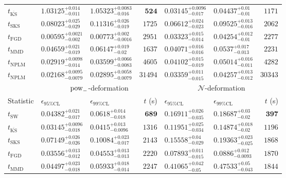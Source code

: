 \begin{tabular}{l|llr|llr}
	$t_{\overline{\mathrm{KS}}}$ & $1.03125_{-0.011}^{+0.014}$ & $1.05323_{-0.016}^{+0.0083}$ & ${\mathbf{524}}$ & ${\mathbf{0.03145_{-0.017}^{+0.0096}}}$ & $0.04437_{-0.01}^{+0.01}$ & $1171$ \\
	$t_{\mathrm{SKS}}$ & $0.08023_{-0.029}^{+0.025}$ & $0.11316_{-0.019}^{+0.026}$ & $1725$ & $0.06612_{-0.023}^{+0.024}$ & $0.09525_{-0.016}^{+0.013}$ & $2062$ \\
	$t_{\mathrm{FGD}}$ & ${\mathbf{0.00595_{-0.002}^{+0.0021}}}$ & ${\mathbf{0.00773_{-0.0016}^{+0.002}}}$ & $2951$ & $0.03323_{-0.014}^{+0.015}$ & ${\mathbf{0.04254_{-0.01}^{+0.012}}}$ & $2277$ \\
	$t_{\mathrm{MMD}}$ & $0.04659_{-0.019}^{+0.021}$ & $0.06147_{-0.02}^{+0.019}$ & $1637$ & $0.04071_{-0.016}^{+0.016}$ & $0.0537_{-0.013}^{+0.017}$ & $2231$ \\
\rowcolor{red!35}	$t_{\mathrm{NPLM}}$ & $0.02919_{-0.014}^{+0.0098}$ & $0.03599_{-0.0083}^{+0.0066}$ & $4605$ & $0.04102_{-0.019}^{+0.015}$ & $0.05014_{-0.011}^{+0.016}$ & $4282$ \\
\rowcolor{blue!35}	$t_{\mathrm{NPLM}}$ & $0.02168_{-0.0079}^{+0.0095}$ & $0.02895_{-0.0079}^{+0.0058}$ & $31494$ & $0.03359_{-0.015}^{+0.011}$ & $0.04257_{-0.012}^{+0.013}$ & $30343$ \\
	\toprule
	\multicolumn{1}{c}{} & \multicolumn{3}{c}{$\rm{pow}_{-}$-deformation} & \multicolumn{3}{c}{$\mathcal{N}$-deformation} \\
Statistic & $\epsilon_{95\%\mathrm{CL}}$ & $\epsilon_{99\%\mathrm{CL}}$ & $t$ (s) & $\epsilon_{95\%\mathrm{CL}}$ & $\epsilon_{99\%\mathrm{CL}}$ & $t$ (s) \\
	\midrule
	$t_{\mathrm{SW}}$ & $0.04382_{-0.017}^{+0.021}$ & $0.0618_{-0.018}^{+0.014}$ & ${\mathbf{689}}$ & $0.16911_{-0.035}^{+0.026}$ & $0.18687_{-0.02}^{+0.03}$ & ${\mathbf{397}}$ \\
	$t_{\overline{\mathrm{KS}}}$ & ${\mathbf{0.03145_{-0.018}^{+0.0096}}}$ & ${\mathbf{0.0415_{-0.0096}^{+0.013}}}$ & $1316$ & $0.11951_{-0.034}^{+0.025}$ & $0.14874_{-0.02}^{+0.018}$ & $1196$ \\
	$t_{\mathrm{SKS}}$ & $0.07149_{-0.026}^{+0.026}$ & $0.10084_{-0.017}^{+0.023}$ & $2143$ & $0.15558_{-0.029}^{+0.04}$ & $0.19363_{-0.025}^{+0.023}$ & $1868$ \\
	$t_{\mathrm{FGD}}$ & $0.03556_{-0.012}^{+0.013}$ & $0.04553_{-0.013}^{+0.013}$ & $2220$ & ${\mathbf{0.07893_{-0.015}^{+0.011}}}$ & ${\mathbf{0.0886_{-0.0093}^{+0.012}}}$ & $1870$ \\
	$t_{\mathrm{MMD}}$ & $0.04497_{-0.018}^{+0.023}$ & $0.05933_{-0.014}^{+0.018}$ & $2247$ & $0.41065_{-0.05}^{+0.042}$ & $0.47533_{-0.043}^{+0.05}$ & $1844$ \\

\end{tabular}

